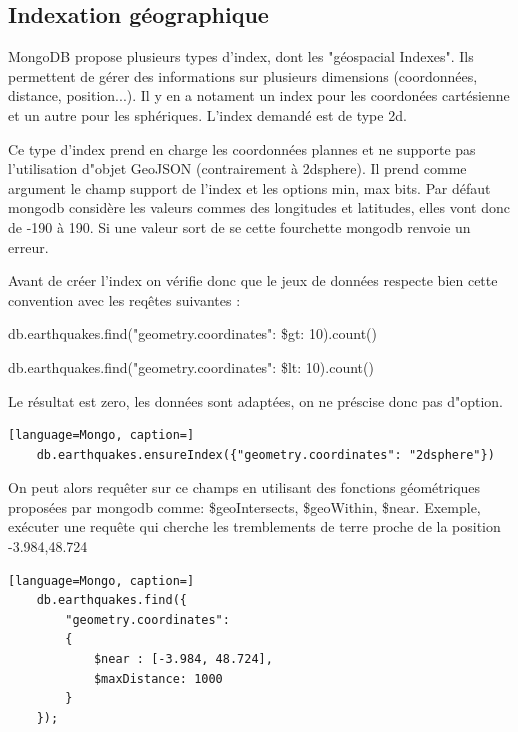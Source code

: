\subsection{Indexation géographique}
    MongoDB propose plusieurs types d'index, dont les "géospacial Indexes". Ils permettent de gérer des informations sur plusieurs dimensions (coordonnées, distance, position...). Il y en a notament un index pour les coordonées cartésienne et un autre pour les sphériques. L'index demandé est de type 2d.
    
    \par Ce type d'index prend en charge les coordonnées plannes  et ne supporte pas l'utilisation d"objet GeoJSON (contrairement à 2dsphere). Il prend comme argument le champ support de l'index et les options min, max bits. Par défaut mongodb considère les valeurs commes des longitudes et latitudes, elles vont donc de -190 à 190. Si une valeur sort de se cette fourchette mongodb renvoie un erreur. 
    
    \par Avant de créer l'index on vérifie donc que le jeux de données respecte bien cette convention avec les reqêtes suivantes : \newline
    \begin{tt} db.earthquakes.find({"geometry.coordinates": {\$gt: 10}}).count() \end{tt} \newline 
    \begin{tt} db.earthquakes.find({"geometry.coordinates": {\$lt: 10}}).count() \end{tt} \newline
    
    Le résultat est zero, les données sont adaptées, on ne préscise donc pas d"option.
    \begin{lstlisting}[language=Mongo, caption=]    
    db.earthquakes.ensureIndex({"geometry.coordinates": "2dsphere"})
    \end{lstlisting}
    
\newpage

    On peut alors requêter sur ce champs en utilisant des fonctions géométriques proposées par mongodb comme: \$geoIntersects, \$geoWithin, \$near. Exemple, exécuter une requête qui cherche les tremblements de terre
proche de la position -3.984,48.724 

    \begin{lstlisting}[language=Mongo, caption=]    
    db.earthquakes.find({
        "geometry.coordinates":
        {
            $near : [-3.984, 48.724],
            $maxDistance: 1000
        }
    });
    \end{lstlisting}